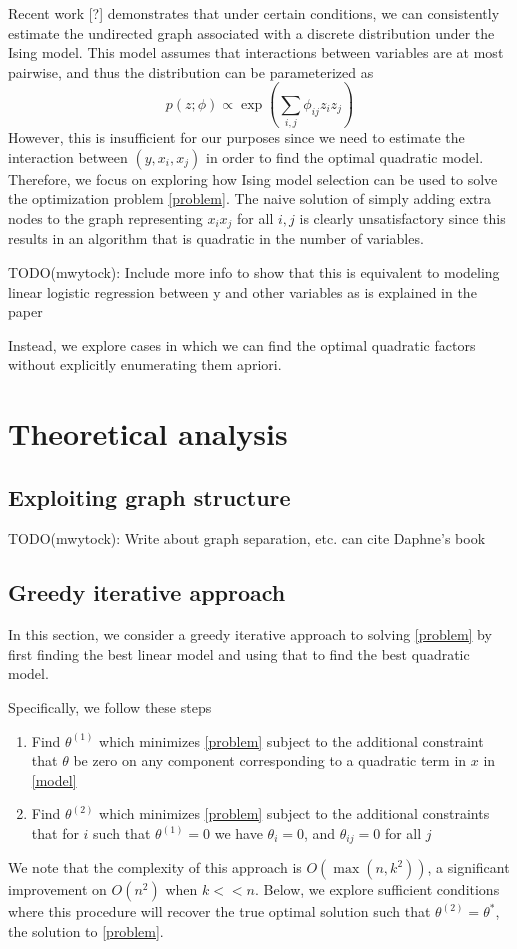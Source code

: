 \documentclass[12pt]{article}
\begin{document}
Recent work [?] demonstrates that under certain conditions, we can consistently estimate the undirected graph associated with a discrete distribution under the Ising model. This model assumes that interactions between variables are at most pairwise, and thus the distribution can be parameterized as
\begin{equation}
p(z;\phi) \propto \exp \left( \sum_{i,j} \phi_{ij}z_iz_j \right)
\end{equation}
However, this is insufficient for our purposes since we need to estimate the interaction between $(y,x_i,x_j)$ in order to find the optimal quadratic model. Therefore, we focus on exploring how Ising model selection can be used to solve the optimization problem \eqref{problem}. The naive solution of simply adding extra nodes to the graph representing $x_ix_j$ for all $i,j$ is clearly unsatisfactory since this results in an algorithm that is quadratic in the number of variables. 

TODO(mwytock): Include more info to show that this is equivalent to modeling linear logistic regression between y and other variables as is explained in the paper  

Instead, we explore cases in which we can find the optimal quadratic factors without explicitly enumerating them apriori.

\section{Theoretical analysis}

\subsection{Exploiting graph structure}

TODO(mwytock): Write about graph separation, etc. can cite Daphne's book

\subsection{Greedy iterative approach}

In this section, we consider a greedy iterative approach to solving \eqref{problem} by first finding the best linear model and using that to find the best quadratic model. 

Specifically, we follow these steps
\begin{enumerate}
\item Find $\theta^{(1)}$ which minimizes \eqref{problem} subject to the additional constraint that $\theta$ be zero on any component corresponding to a quadratic term in $x$ in \eqref{model}
\item Find $\theta^{(2)}$ which minimizes \eqref{problem} subject to the additional constraints that for $i$ such that $\theta^{(1)} = 0$ we have $\theta_i = 0$, and $\theta_{ij} = 0$ for all $j$ 
\end{enumerate}
We note that the complexity of this approach is $O(\max(n, k^2))$, a significant improvement on $O(n^2)$ when $k << n$. Below, we explore sufficient conditions where this procedure will recover the true optimal solution such that $\theta^{(2)} = \theta^*$, the solution to \eqref{problem}.
\end{document}
